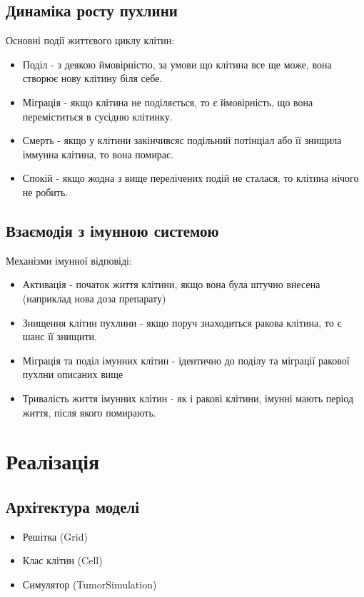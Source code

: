 \documentclass{article}
\begin{document}
\subsection{Динаміка росту пухлини}
Основні події життєвого циклу клітин:
\begin{itemize}
    \item Поділ - з деякою ймовірністю, за умови що клітина все ще може, вона створює нову клітину біля себе.
    \item Міграція - якщо клітина не поділяється, то є ймовірність, що вона переміститься в сусідню клітинку.
    \item Смерть - якщо у клітини закінчивсяс подільний потінціал або її знищила іммунна клітина, то вона помирає.
    \item Спокій - якщо жодна з вище перелічених подій не сталася, то клітина нічого не робить.
\end{itemize}

\subsection{Взаємодія з імунною системою}
Механізми імунної відповіді:
\begin{itemize}
    \item Активація - початок життя клітини, якщо вона була штучно внесена (наприклад нова доза препарату)
    \item Знищення клітин пухлини - якщо поруч знаходиться ракова клітина, то є шанс її знищити.
    \item Міграція та поділ імунних клітин - ідентично до поділу та міграції ракової пухлни описаних вище
    \item Тривалість життя імунних клітин - як і ракові клітини, імунні мають період життя, після якого помирають.
\end{itemize}

\section{Реалізація}
\subsection{Архітектура моделі}
\begin{itemize}
    \item Решітка (Grid)
    \item Клас клітин (Cell)
    \item Симулятор (TumorSimulation)
\end{itemize}
\end{document}
